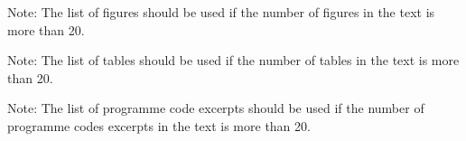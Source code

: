 \documentclass[11pt,a4paper]{report}
\let\openright=\clearpage
\begin{document}


\setcounter{tocdepth}{2}
\tableofcontents

\openright
\listoffigures

Note: The list of figures should be used if the number of figures in the text is more than 20.

\clearpage
\listoftables

Note: The list of tables should be used if the number of tables in the text is more than 20.  

\clearpage
\lstlistoflistings
Note: The list of programme code excerpts should be used if the number of programme codes excerpts in the text is more than 20.





{%
\pagestyle{plain}
%
}


%
%
%
% 
% 

{%
\pagestyle{fancyx}




}

{%
\pagestyle{plain}

}



\part*{\Prilohy\thispagestyle{empty}}
\appendix


% 
% 
\end{document}
